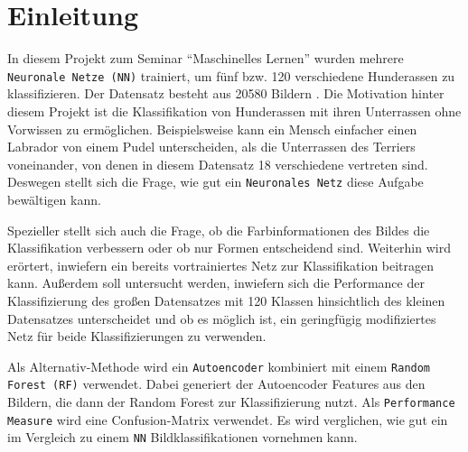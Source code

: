 \section{Einleitung}
In diesem Projekt zum Seminar \enquote{Maschinelles Lernen} wurden mehrere
\texttt{Neuronale Netze (NN)} trainiert, um fünf bzw. 120 verschiedene
Hunderassen zu klassifizieren. Der Datensatz besteht aus 20580 Bildern
\cite{datensatz}. Die Motivation hinter diesem Projekt ist die Klassifikation
von Hunderassen mit ihren Unterrassen ohne Vorwissen zu ermöglichen.
Beispielsweise kann ein Mensch einfacher einen Labrador von einem Pudel
unterscheiden, als die Unterrassen des Terriers voneinander, von denen in diesem
Datensatz 18 verschiedene vertreten sind. Deswegen stellt sich die Frage, wie
gut ein \texttt{Neuronales Netz} diese Aufgabe bewältigen kann.

Spezieller stellt sich auch die Frage, ob die Farbinformationen des Bildes die
Klassifikation verbessern oder ob nur Formen entscheidend sind. Weiterhin wird
erörtert, inwiefern ein bereits vortrainiertes Netz zur Klassifikation beitragen
kann. Außerdem soll untersucht werden, inwiefern sich die Performance der
Klassifizierung des großen Datensatzes mit 120 Klassen hinsichtlich des kleinen
Datensatzes unterscheidet und ob es möglich ist, ein geringfügig modifiziertes
Netz für beide Klassifizierungen zu verwenden.

Als Alternativ-Methode wird ein \texttt{Autoencoder} kombiniert mit einem
\texttt{Random Forest (RF)} verwendet. Dabei generiert der Autoencoder Features
aus den Bildern, die dann der Random Forest zur Klassifizierung nutzt. Als
\texttt{Performance Measure} wird eine Confusion-Matrix verwendet.
Es wird verglichen, wie gut ein \RF{} im Vergleich zu einem \texttt{NN}
Bildklassifikationen vornehmen kann.
